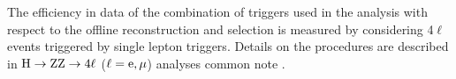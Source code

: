 The efficiency in data of the combination of triggers used in the analysis with respect to the offline reconstruction and selection is measured
by considering 4$\ell$ events triggered by single lepton triggers. Details on the procedures are described in $\mathrm{H}\rightarrow{\rm Z}{\rm Z}\rightarrow4\ell$ ($\ell={\rm e},\mu$) analyses common note \cite{CMS-PAS-HIG-19-001}. 
%
%

